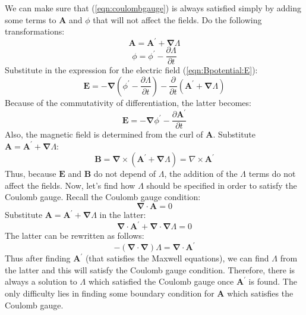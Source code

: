 \documentclass{warpdoc}
\renewcommand{\vec}[1]{\bm{#1}}
\begin{document}
We can make sure that (\ref{eqn:coulombgauge}) is always satisfied simply by adding some terms to $\vec{A}$ and $\phi$ that will not affect the fields. Do the following transformations:
%
\begin{equation}
  \vec{A}=\vec{A}^\prime + \vec{\nabla} \Lambda
\end{equation}
%
%
\begin{equation}
  \phi=\phi^\prime - \frac{\partial\Lambda}{\partial t}
\end{equation}
%
Substitute in the expression for the electric field (\ref{eqn:Bpotential:E}):
%
\begin{equation}
\vec{E}=  -\vec{\nabla} \left( \phi^\prime - \frac{\partial\Lambda}{\partial t}\right) -\frac{\partial }{\partial t}\left( \vec{A}^\prime + \vec{\nabla} \Lambda \right) 
\end{equation}
%
Because of the commutativity of differentiation, the latter becomes:
%
\begin{equation}
\vec{E}=  -\vec{\nabla} \phi^\prime  -\frac{\partial \vec{A}^\prime}{\partial t}
\end{equation}
%
Also, the magnetic field is determined from the curl of $\vec{A}$. Substitute $\vec{A}=\vec{A}^\prime + \vec{\nabla} \Lambda$:
%
\begin{equation}
\vec{B}=\vec{\nabla} \times \left( \vec{A}^\prime + \vec{\nabla} \Lambda\right)=\nabla \times  \vec{A}^\prime
\end{equation}
%
Thus, because $\vec{E}$ and $\vec{B}$ do not depend of $\Lambda$, the addition of the $\Lambda$ terms do not affect the fields. Now, let's find how $\Lambda$ should be specified in order to satisfy the Coulomb gauge. Recall the Coulomb gauge condition:
%
\begin{equation}
\vec{\nabla}\cdot\vec{A}=0
\end{equation}
%
Substitute $\vec{A}=\vec{A}^\prime + \vec{\nabla} \Lambda$ in the latter:
%
\begin{equation}
  \vec{\nabla}\cdot\vec{A}^\prime 
+ \vec{\nabla}\cdot \vec{\nabla} \Lambda
=
0
\end{equation}
%
The latter can be rewritten as follows:
%
\begin{equation}
- (\vec{\nabla}\cdot \vec{\nabla}) \Lambda
=
\vec{\nabla}\cdot\vec{A}^\prime 
\end{equation}
%
Thus after finding $\vec{A}^\prime$  (that satisfies the Maxwell equations), we can find $\Lambda$ from the latter and this will satisfy the Coulomb gauge condition. Therefore, there is always a solution to $\Lambda$ which satisfied the Coulomb gauge once $\vec{A}^\prime$ is found. The only difficulty lies in finding some boundary condition for $\vec{A}$ which satisfies the Coulomb gauge. 
\end{document}
